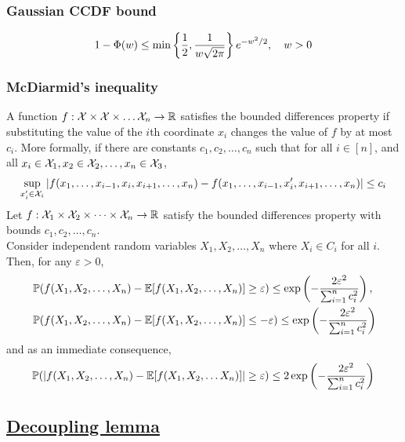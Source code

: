 \documentclass[10pt]{article}
\begin{document}
\subsubsection{Gaussian CCDF bound}
\begin{equation}
    1 - \Phi (w) \leq \min \left\{ \frac{1}{2}, \frac{1}{w \sqrt{2 \pi}} \right\} e^{-w^2 /2}, \quad w > 0 
\end{equation}
\subsubsection{McDiarmid's inequality}
A function $f : \mathcal{X} \times \mathcal{X} \times \dots \mathcal{X}_n \to \mathbb{R}$ satisfies the bounded differences property if substituting the value of the $i$th coordinate $x_i$ changes the value of $f$ by at most $c_i$. More formally, if there are constants $c_1, c_2, \dots, c_n$ such that for all $i \in [n]$, and all $x_i \in \mathcal{X}_1, x_2 \in \mathcal{X}_2, \dots, x_n \in \mathcal{X}_3$, 
\begin{equation}
    \sup_{x_i^{\prime} \in \mathcal{X}_i} | f(x_1, \dots, x_{i-1}, x_i, x_{i+1}, \dots, x_n) - f(x_1, \dots, x_{i-1}, x_i^{\prime}, x_{i+1} , \dots, x_n) | \leq c_i 
\end{equation}
Let $f: \mathcal{X}_1 \times \mathcal{X}_2 \times \cdots \times \mathcal{X}_n \to \mathbb{R}$ satisfy the bounded differences property with bounds $c_1, c_2, \dots, c_n$. \\ 
Consider independent random variables $X_1, X_2, \dots, X_n$ where $X_i \in C_i$ for all $i$. Then, for any $\varepsilon >0$, 
\begin{align}
    & \mathop{\mathbb{P} \displaystyle} ( f(X_1, X_2, \dots, X_n) - \mathop{\mathbb{E} \displaystyle}[f(X_1, X_2, \dots, X_n)] \geq \varepsilon) \leq \exp \left( -\frac{2 \varepsilon^2}{\sum_{i=1}^n c_i^2} \right), \\ 
    & \mathop{\mathbb{P} \displaystyle}( f(X_1, X_2, \dots, X_n) - \mathop{\mathbb{E} \displaystyle}[f(X_1, X_2, \dots, X_n)] \leq - \varepsilon) \leq \exp \left( - \frac{2 \varepsilon^2}{\sum_{i=1}^n c_i^2} \right) 
\end{align}
and as an immediate  consequence, 
\begin{equation}
    \mathop{\mathbb{P} \displaystyle}(| f(X_1, X_2, \dots, X_n) - \mathop{\mathbb{E} \displaystyle}[f(X_1, X_2, \dots X_n)] | \geq \varepsilon) \leq 2 \exp \left( - \frac{2 \varepsilon^2}{\sum_{i=1}^n c_i^2} \right) 
\end{equation}

\subsection{\href{https://bsky.app/profile/stein.ke}{Decoupling lemma}}
\end{document}
